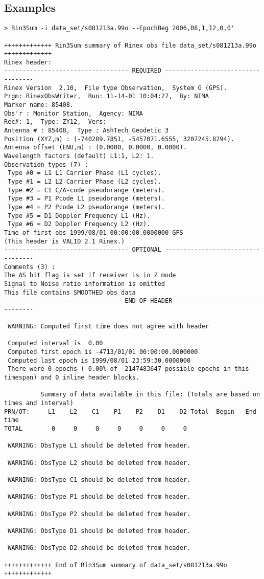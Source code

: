 \subsection{Examples}
\begin{\outputsize}
\begin{lstlisting}
> Rin3Sum -i data_set/s081213a.99o --EpochBeg 2006,08,1,12,0,0'

+++++++++++++ Rin3Sum summary of Rinex obs file data_set/s081213a.99o +++++++++++++
Rinex header:
---------------------------------- REQUIRED ----------------------------------
Rinex Version  2.10,  File type Observation,  System G (GPS).
Prgm: RinexObsWriter,  Run: 11-14-01 10:04:27,  By: NIMA
Marker name: 85408.
Obs'r : Monitor Station,  Agency: NIMA
Rec#: 1,  Type: ZY12,  Vers:
Antenna # : 85408,  Type : AshTech Geodetic 3
Position (XYZ,m) : (-740289.7851, -5457071.6555, 3207245.8294).
Antenna offset (ENU,m) : (0.0000, 0.0000, 0.0000).
Wavelength factors (default) L1:1, L2: 1.
Observation types (7) :
 Type #0 = L1 L1 Carrier Phase (L1 cycles).
 Type #1 = L2 L2 Carrier Phase (L2 cycles).
 Type #2 = C1 C/A-code pseudorange (meters).
 Type #3 = P1 Pcode L1 pseudorange (meters).
 Type #4 = P2 Pcode L2 pseudorange (meters).
 Type #5 = D1 Doppler Frequency L1 (Hz).
 Type #6 = D2 Doppler Frequency L2 (Hz).
Time of first obs 1999/08/01 00:00:00.0000000 GPS
(This header is VALID 2.1 Rinex.)
---------------------------------- OPTIONAL ----------------------------------
Comments (3) :
The AS bit flag is set if receiver is in Z mode
Signal to Noise ratio information is omitted
This file contains SMOOTHED obs data
-------------------------------- END OF HEADER -------------------------------

 WARNING: Computed first time does not agree with header

 Computed interval is  0.00
 Computed first epoch is -4713/01/01 00:00:00.0000000
 Computed last epoch is 1999/08/01 23:59:30.0000000
 There were 0 epochs (-0.00% of -2147483647 possible epochs in this timespan) and 0 inline header blocks.

          Summary of data available in this file: (Totals are based on times and interval)
PRN/OT:     L1    L2    C1    P1    P2    D1    D2 Total  Begin - End time
TOTAL        0     0     0     0     0     0     0

 WARNING: ObsType L1 should be deleted from header.

 WARNING: ObsType L2 should be deleted from header.

 WARNING: ObsType C1 should be deleted from header.

 WARNING: ObsType P1 should be deleted from header.

 WARNING: ObsType P2 should be deleted from header.

 WARNING: ObsType D1 should be deleted from header.

 WARNING: ObsType D2 should be deleted from header.

+++++++++++++ End of Rin3Sum summary of data_set/s081213a.99o +++++++++++++
\end{lstlisting}
\end{\outputsize}

%
